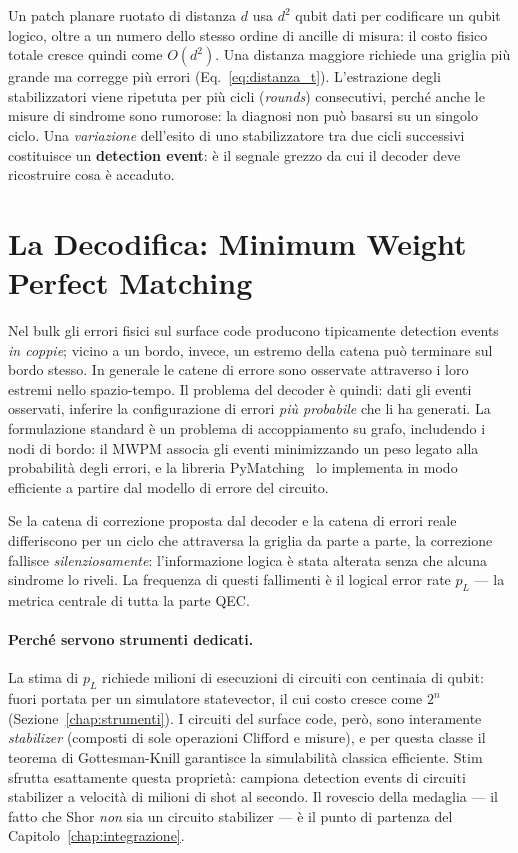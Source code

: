 \begin{onehalfspace}
Un patch planare ruotato di distanza $d$ usa $d^2$ qubit dati per codificare un qubit logico, oltre a un numero dello stesso ordine di ancille di misura: il costo fisico totale cresce quindi come $O(d^2)$. Una distanza maggiore richiede una griglia più grande ma corregge più errori (Eq.~\ref{eq:distanza_t}). L'estrazione degli stabilizzatori viene ripetuta per più cicli (\textit{rounds}) consecutivi, perché anche le misure di sindrome sono rumorose: la diagnosi non può basarsi su un singolo ciclo. Una \emph{variazione} dell'esito di uno stabilizzatore tra due cicli successivi costituisce un \textbf{detection event}: è il segnale grezzo da cui il decoder deve ricostruire cosa è accaduto.

\section{La Decodifica: Minimum Weight Perfect Matching}
\label{sec:mwpm}

Nel bulk gli errori fisici sul surface code producono tipicamente detection events \emph{in coppie}; vicino a un bordo, invece, un estremo della catena può terminare sul bordo stesso. In generale le catene di errore sono osservate attraverso i loro estremi nello spazio-tempo. Il problema del decoder è quindi: dati gli eventi osservati, inferire la configurazione di errori \emph{più probabile} che li ha generati. La formulazione standard è un problema di accoppiamento su grafo, includendo i nodi di bordo: il \ac{MWPM} associa gli eventi minimizzando un peso legato alla probabilità degli errori, e la libreria PyMatching~\cite{pymatching2021} lo implementa in modo efficiente a partire dal modello di errore del circuito.

Se la catena di correzione proposta dal decoder e la catena di errori reale differiscono per un ciclo che attraversa la griglia da parte a parte, la correzione fallisce \emph{silenziosamente}: l'informazione logica è stata alterata senza che alcuna sindrome lo riveli. La frequenza di questi fallimenti è il logical error rate $p_L$ --- la metrica centrale di tutta la parte QEC.

\paragraph{Perché servono strumenti dedicati.}
La stima di $p_L$ richiede milioni di esecuzioni di circuiti con centinaia di qubit: fuori portata per un simulatore statevector, il cui costo cresce come $2^n$ (Sezione~\ref{chap:strumenti}). I circuiti del surface code, però, sono interamente \emph{stabilizer} (composti di sole operazioni Clifford e misure), e per questa classe il teorema di Gottesman-Knill garantisce la simulabilità classica efficiente. Stim~\cite{stim2021} sfrutta esattamente questa proprietà: campiona detection events di circuiti stabilizer a velocità di milioni di shot al secondo. Il rovescio della medaglia --- il fatto che Shor \emph{non} sia un circuito stabilizer --- è il punto di partenza del Capitolo~\ref{chap:integrazione}.


\end{onehalfspace}

